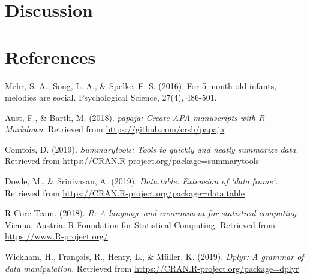 \documentclass[man]{apa6}
\begin{document}
\section{Discussion}\label{discussion}

\newpage

\section{References}\label{references}

Mehr, S. A., Song, L. A., \& Spelke, E. S. (2016). For 5-month-old
infants, melodies are social. Psychological Science, 27(4), 486-501.

\begingroup
\setlength{\parindent}{-0.5in} \setlength{\leftskip}{0.5in}

\hypertarget{refs}{}
\hypertarget{ref-R-papaja}{}
Aust, F., \& Barth, M. (2018). \emph{papaja: Create APA manuscripts with
R Markdown}. Retrieved from \url{https://github.com/crsh/papaja}

\hypertarget{ref-R-summarytools}{}
Comtois, D. (2019). \emph{Summarytools: Tools to quickly and neatly
summarize data}. Retrieved from
\url{https://CRAN.R-project.org/package=summarytools}

\hypertarget{ref-R-data.table}{}
Dowle, M., \& Srinivasan, A. (2019). \emph{Data.table: Extension of
`data.frame`}. Retrieved from
\url{https://CRAN.R-project.org/package=data.table}

\hypertarget{ref-R-base}{}
R Core Team. (2018). \emph{R: A language and environment for statistical
computing}. Vienna, Austria: R Foundation for Statistical Computing.
Retrieved from \url{https://www.R-project.org/}

\hypertarget{ref-R-dplyr}{}
Wickham, H., François, R., Henry, L., \& Müller, K. (2019). \emph{Dplyr:
A grammar of data manipulation}. Retrieved from
\url{https://CRAN.R-project.org/package=dplyr}

\endgroup
\end{document}
